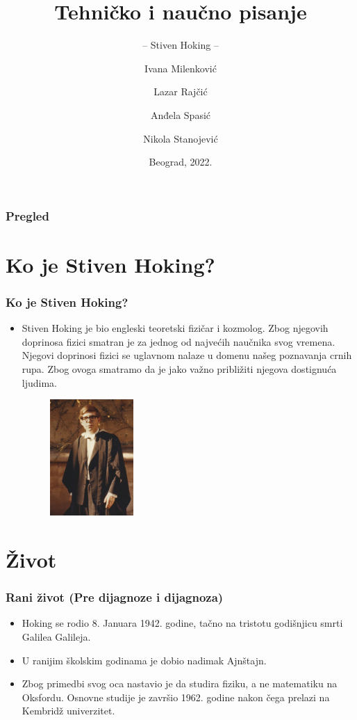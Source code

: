 \documentclass{beamer}
\title{Tehničko i naučno pisanje}
\subtitle{-- Stiven Hoking --}
\author{ Ivana Milenković\\ \and Lazar Rajčić\\ \and Anđela Spasić\\ \and Nikola Stanojević }
\institute{Matematički fakultet\\Univerzitet u Beogradu}
\date{
	\footnotesize{Beograd, 2022.}	
}
\begin{document}
\begin{frame}
	\thispagestyle{empty}
	\titlepage
\end{frame}

\addtocounter{framenumber}{-1}

\begin{frame} \fontsize{9}{6}\selectfont
	\frametitle{Pregled}
	\tableofcontents[hidesubsections] 
\end{frame}
\section{Ko je Stiven Hoking?}

\begin{frame}[fragile]\frametitle{Ko je Stiven Hoking?}
	\begin{itemize} \fontsize{9}{6}\selectfont	
		\item  Stiven Hoking je bio engleski teoretski fizičar i kozmolog. Zbog njegovih doprinosa fizici smatran je za jednog od najvećih naučnika svog vremena. Njegovi doprinosi fizici se uglavnom nalaze u domenu našeg poznavanja crnih rupa. Zbog ovoga smatramo da je jako važno približiti njegova dostignuća ljudima.
\begin{figure}[h!]
  \centering
  \includegraphics[width=0.3\textwidth]{Hoking,PreDijagnoze.jpg}
  \captionsetup{font=small}{Slika1: Hoking, na dodeli diploma 1960.}
  \label{fig:Hoking,PreDijagnoze}
  \end{figure}
	\end{itemize}
\end{frame}

\section{Život}
\begin{frame}[fragile]\frametitle{Rani život (Pre dijagnoze i dijagnoza)}
\begin{itemize}	 \fontsize{9}{6}\selectfont
		
\item  Hoking se rodio 8. Januara 1942. godine, tačno na tristotu godišnjicu smrti Galilea Galileja.
\item  U ranijim školskim godinama je dobio nadimak Ajnštajn.
\item  Zbog primedbi svog oca nastavio je da studira fiziku, a ne matematiku na Oksfordu. Osnovne studije je završio 1962. godine nakon čega prelazi na Kembridž univerzitet.
\end{itemize}
\end{frame}
\end{document}
